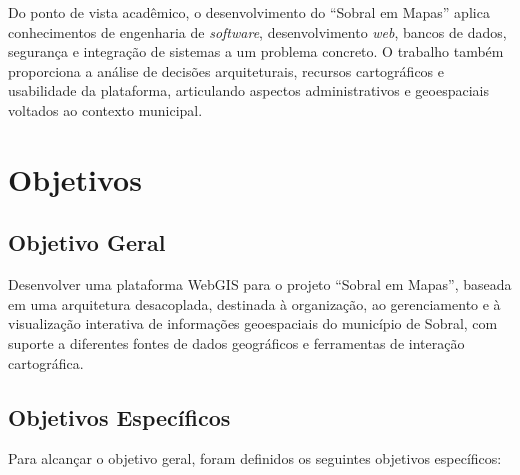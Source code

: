 Do ponto de vista acadêmico, o desenvolvimento do ``Sobral em Mapas'' aplica conhecimentos de engenharia de \textit{software}, desenvolvimento \textit{web}, bancos de dados, segurança e integração de sistemas a um problema concreto. O trabalho também proporciona a análise de decisões arquiteturais, recursos cartográficos e usabilidade da plataforma, articulando aspectos administrativos e geoespaciais voltados ao contexto municipal.

\section{Objetivos}

\subsection{Objetivo Geral}

Desenvolver uma plataforma \gls{WebGIS} para o projeto ``Sobral em Mapas'', baseada em uma arquitetura desacoplada, destinada à organização, ao gerenciamento e à visualização interativa de informações geoespaciais do município de Sobral, com suporte a diferentes fontes de dados geográficos e ferramentas de interação cartográfica.

\subsection{Objetivos Específicos}

Para alcançar o objetivo geral, foram definidos os seguintes objetivos específicos:

